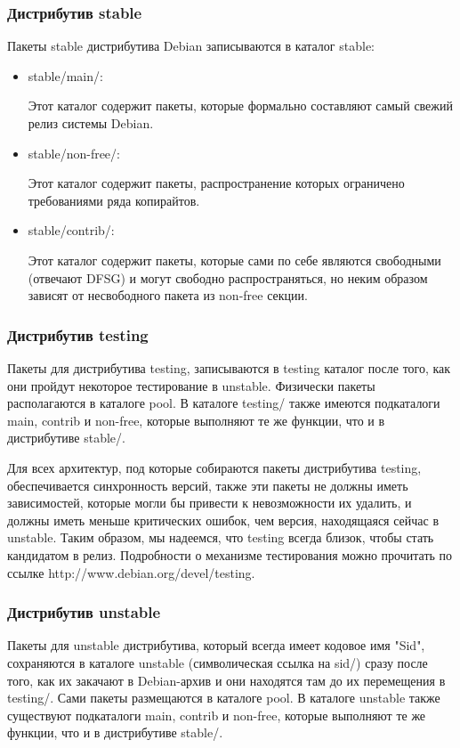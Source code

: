 \documentclass[12pt,a4paper]{article}
\begin{document}
\subsubsection{Дистрибутив stable}
Пакеты stable дистрибутива Debian записываются в каталог stable:
\begin{itemize}
  \item stable/main/: 
  
   Этот каталог содержит пакеты, которые формально составляют самый свежий релиз системы Debian.
  \item stable/non-free/:
  
  Этот каталог содержит пакеты, распространение которых ограничено требованиями ряда копирайтов.
  \item stable/contrib/:
  
  Этот каталог содержит пакеты, которые сами по себе являются свободными (отвечают DFSG) и могут свободно распространяться, но неким образом зависят от несвободного пакета из non-free секции.
\end{itemize}
\subsubsection{Дистрибутив testing}
Пакеты для дистрибутива testing, записываются в testing каталог после того, как они пройдут некоторое тестирование в unstable. Физически пакеты располагаются в каталоге pool. В каталоге testing/ также имеются подкаталоги main, contrib и non-free, которые выполняют те же функции, что и в дистрибутиве stable/.

Для всех архитектур, под которые собираются пакеты дистрибутива testing, обеспечивается синхронность версий, также эти пакеты не должны иметь зависимостей, которые могли бы привести к невозможности их удалить, и должны иметь меньше критических ошибок, чем версия, находящаяся сейчас в unstable. Таким образом, мы надеемся, что testing всегда близок, чтобы стать кандидатом в релиз. Подробности о механизме тестирования можно прочитать по ссылке http://www.debian.org/devel/testing.

\subsubsection{Дистрибутив unstable}

Пакеты для unstable дистрибутива, который всегда имеет кодовое имя "Sid", сохраняются в каталоге unstable (символическая ссылка на sid/) сразу после того, как их закачают в Debian-архив и они находятся там до их перемещения в testing/. Сами пакеты размещаются в каталоге pool. В каталоге unstable также существуют подкаталоги main, contrib и non-free, которые выполняют те же функции, что и в дистрибутиве stable/.
 
\end{document}

